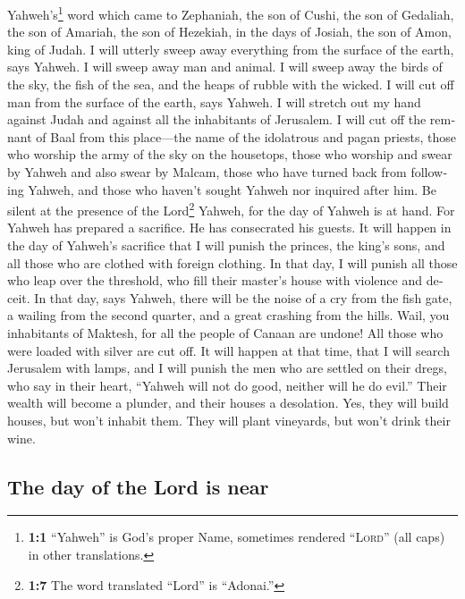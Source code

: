\begin{paracol}{2}
\begin{otherlanguage}{english}
 Yahweh's\footnote{\textbf{1:1} ``Yahweh'' is God's proper
  Name, sometimes rendered ``\textsc{Lord}'' (all caps) in other
  translations.} word which came to Zephaniah, the son of Cushi, the son
of Gedaliah, the son of Amariah, the son of Hezekiah, in the days of
Josiah, the son of Amon, king of Judah.  I will utterly
sweep away everything from the surface of the earth, says Yahweh.
 I will sweep away man and animal. I will sweep away the
birds of the sky, the fish of the sea, and the heaps of rubble with the
wicked. I will cut off man from the surface of the earth, says Yahweh.
 I will stretch out my hand against Judah and against all
the inhabitants of Jerusalem. I will cut off the remnant of Baal from
this place---the name of the idolatrous and pagan priests,
 those who worship the army of the sky on the housetops,
those who worship and swear by Yahweh and also swear by Malcam,
 those who have turned back from following Yahweh, and
those who haven't sought Yahweh nor inquired after him. 
Be silent at the presence of the Lord\footnote{\textbf{1:7} The word
  translated ``Lord'' is ``Adonai.''} Yahweh, for the day of Yahweh is
at hand. For Yahweh has prepared a sacrifice. He has consecrated his
guests.  It will happen in the day of Yahweh's sacrifice
that I will punish the princes, the king's sons, and all those who are
clothed with foreign clothing.  In that day, I will punish
all those who leap over the threshold, who fill their master's house
with violence and deceit.  In that day, says Yahweh,
there will be the noise of a cry from the fish gate, a wailing from the
second quarter, and a great crashing from the hills. 
Wail, you inhabitants of Maktesh, for all the people of Canaan are
undone! All those who were loaded with silver are cut off.
 It will happen at that time, that I will search
Jerusalem with lamps, and I will punish the men who are settled on their
dregs, who say in their heart, ``Yahweh will not do good, neither will
he do evil.''  Their wealth will become a plunder, and
their houses a desolation. Yes, they will build houses, but won't
inhabit them. They will plant vineyards, but won't drink their wine.

\hypertarget{the-day-of-the-lord-is-near}{%
\subsection{The day of the Lord is
near}\label{the-day-of-the-lord-is-near}}


\end{otherlanguage}
\end{paracol}
